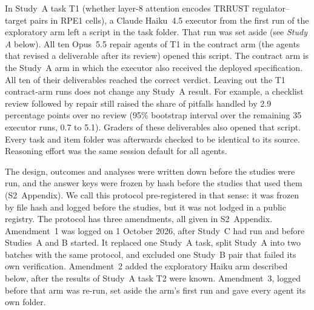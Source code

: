 In Study~A task T1 (whether layer-8 attention encodes TRRUST
regulator--target pairs in RPE1 cells), a Claude
Haiku~4.5 executor from the first run of the exploratory arm left a
script in the task folder. That run was set aside (see \emph{Study A}
below). All ten Opus~5.5 repair agents of T1 in the contract arm (the
agents that revised a deliverable after its review) opened this script. The contract arm is the Study~A arm in which the
executor also received the deployed specification. All ten of their
deliverables reached the correct verdict. Leaving out the T1
contract-arm runs does not change any Study~A result. For example, a
checklist review followed by repair still raised the share of pitfalls
handled by 2.9 percentage points over no review (95\% bootstrap interval
over the remaining 35 executor runs, 0.7 to 5.1). Graders of these
deliverables also opened that script.
Every task and item folder was afterwards checked to be identical to its
source.
Reasoning effort was the same session default for all agents.

The design, outcomes and analyses were written down before the studies
were run, and the answer keys were frozen by hash before the studies that
used them (S2~Appendix). We call this protocol pre-registered in that
sense: it was frozen by file hash and logged before the studies, but it
was not lodged in a public registry. The protocol has three amendments, all given in
S2~Appendix. Amendment~1 was logged on 1 October 2026, after Study~C had run
and before Studies~A and B started. It replaced one Study~A task, split
Study~A into two batches with the same protocol, and excluded one Study~B
pair that failed its own verification. Amendment~2 added the exploratory
Haiku arm described below, after the results of Study~A task T2 were
known. Amendment~3, logged before that arm was re-run, set aside the
arm's first run and gave every agent its own folder.

